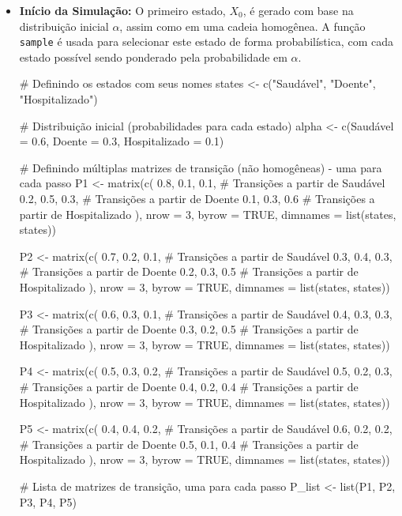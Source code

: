 \documentclass[12pt]{article}
\theoremstyle{break}
\begin{document}
\begin{itemize}
\item \textbf{Início da Simulação:} O primeiro estado, \( X_0 \), é gerado com base na distribuição inicial \( \alpha \), assim como em uma cadeia homogênea. A função \texttt{sample} é usada para selecionar este estado de forma probabilística, com cada estado possível sendo ponderado pela probabilidade em \( \alpha \). 



\begin{RCodeBox}
# Definindo os estados com seus nomes
states <- c("Saudável", "Doente", "Hospitalizado")

# Distribuição inicial (probabilidades para cada estado)
alpha <- c(Saudável = 0.6, Doente = 0.3, Hospitalizado = 0.1)

# Definindo múltiplas matrizes de transição (não homogêneas) - uma para cada passo
P1 <- matrix(c(
  0.8, 0.1, 0.1,  # Transições a partir de Saudável
  0.2, 0.5, 0.3,  # Transições a partir de Doente
  0.1, 0.3, 0.6   # Transições a partir de Hospitalizado
), nrow = 3, byrow = TRUE, dimnames = list(states, states))

P2 <- matrix(c(
  0.7, 0.2, 0.1,  # Transições a partir de Saudável
  0.3, 0.4, 0.3,  # Transições a partir de Doente
  0.2, 0.3, 0.5   # Transições a partir de Hospitalizado
), nrow = 3, byrow = TRUE, dimnames = list(states, states))

P3 <- matrix(c(
  0.6, 0.3, 0.1,  # Transições a partir de Saudável
  0.4, 0.3, 0.3,  # Transições a partir de Doente
  0.3, 0.2, 0.5   # Transições a partir de Hospitalizado
), nrow = 3, byrow = TRUE, dimnames = list(states, states))

\end{RCodeBox}


\begin{RCodeBox}

P4 <- matrix(c(
  0.5, 0.3, 0.2,  # Transições a partir de Saudável
  0.5, 0.2, 0.3,  # Transições a partir de Doente
  0.4, 0.2, 0.4   # Transições a partir de Hospitalizado
), nrow = 3, byrow = TRUE, dimnames = list(states, states))

P5 <- matrix(c(
  0.4, 0.4, 0.2,  # Transições a partir de Saudável
  0.6, 0.2, 0.2,  # Transições a partir de Doente
  0.5, 0.1, 0.4   # Transições a partir de Hospitalizado
), nrow = 3, byrow = TRUE, dimnames = list(states, states))

# Lista de matrizes de transição, uma para cada passo
P_list <- list(P1, P2, P3, P4, P5)


\end{RCodeBox}
\end{itemize}
\end{document}
